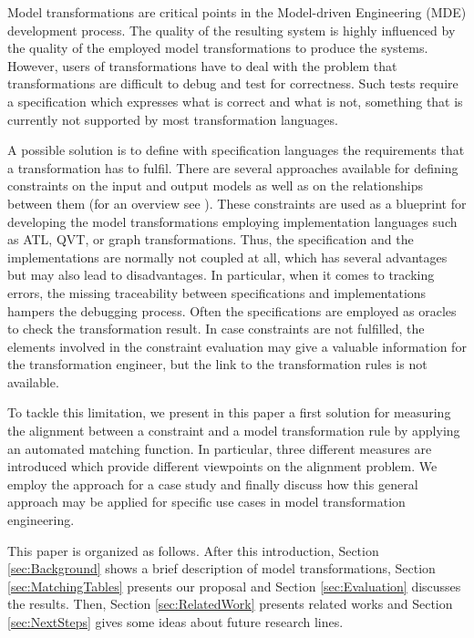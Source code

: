 Model transformations are critical points in the Model-driven Engineering (MDE) development process. The quality of the resulting system is highly influenced by the quality of the employed model transformations to produce the systems. However, users of transformations have to deal with the problem that transformations are difficult to debug and test for correctness. Such tests require a specification
which expresses what is correct and what is not, something that is currently not supported by most transformation languages.

A possible solution is to define with specification languages the requirements that a transformation has to fulfil. There are several approaches available for defining constraints on the input and output models as well as on the relationships between them (for an overview see \cite{VallecilloGBWH12}). These constraints are used as a blueprint for developing the model transformations employing implementation languages such as ATL, QVT, or graph transformations. Thus, the specification and the implementations are normally not coupled at all, which has several advantages but may also lead to disadvantages. In particular, when it comes to tracking errors, the missing traceability between specifications and implementations hampers the debugging process. Often the specifications are employed as oracles to check the transformation result. In case constraints are not fulfilled, the elements involved in the constraint evaluation may give a valuable information for the transformation engineer, but the link to the transformation rules is not available.

To tackle this limitation, we present in this paper a first solution for measuring the alignment between a constraint and a model transformation rule by applying an automated matching function. In particular, three different measures are introduced which provide different viewpoints on the alignment problem. We employ the approach for a case study and finally discuss how this general approach may be applied for specific use cases in model transformation engineering.

This paper is organized as follows. After this introduction, Section \ref{sec:Background} shows a brief description of model transformations, Section \ref{sec:MatchingTables} presents our proposal and Section \ref{sec:Evaluation} discusses the results. Then, Section \ref{sec:RelatedWork} presents related works and Section \ref{sec:NextSteps} gives some ideas about future research lines.
